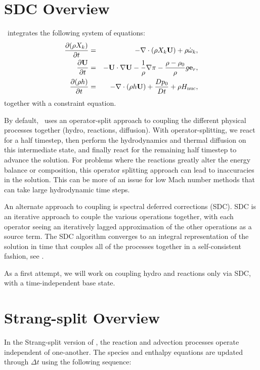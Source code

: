 \section{SDC Overview}

\maestro\ integrates the following system of equations:
\begin{eqnarray}
\frac{\partial(\rho X_k)}{\partial t} &=& 
    -\nabla\cdot(\rho X_k{\bf U}) + \rho\dot{\omega}_k,\label{eq:species}\\
\frac{\partial{\bf U}}{\partial t} &=& 
    -{\bf U}\cdot\nabla{\bf U}  - \frac{1}{\rho}\nabla\pi 
    - \frac{\rho-\rho_0}{\rho} g{\bf e}_r,\label{eq:momentum}\\
\frac{\partial(\rho h)}{\partial t} &=& 
    -\nabla\cdot(\rho h{\bf U}) + \frac{Dp_0}{Dt} 
    + \rho{H_{\rm nuc}} ,\label{eq:enthalpy}
\end{eqnarray}
together with a constraint equation.

By default, \maestro\ uses an operator-split approach to coupling
the different physical processes together (hydro, reactions, diffusion).
With operator-splitting, we
react for a half timestep, then perform the hydrodynamics and thermal
diffusion on this intermediate state, and finally react for the
remaining half timestep to advance the solution.  For problems where
the reactions greatly alter the energy balance or composition, this
operator splitting approach can lead to inaccuracies in the solution.
This can be more of an issue for low Mach number methods that can take
large hydrodynamic time steps.

An alternate approach to coupling is spectral deferred corrections
(SDC). SDC is an iterative approach to couple the various operations
together, with each operator seeing an iteratively lagged
approximation of the other operations as a source term.  The SDC
algorithm converges to an integral representation of the solution in
time that couples all of the processes together in a self-consistent
fashion, see \cite{Non11}.

As a first attempt, we will work on coupling hydro and reactions only
via SDC, with a time-independent base state.  



\section{Strang-split Overview}

In the Strang-split version of \maestro, the reaction and advection
processes operate independent of one-another.  The species and
enthalpy equations are updated through $\Delta t$ using the following
sequence:

